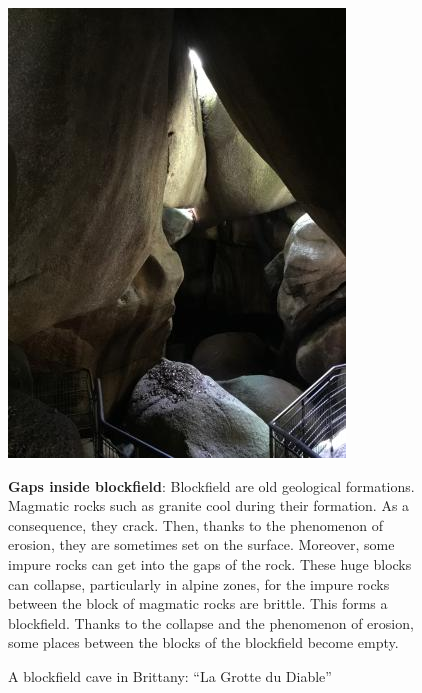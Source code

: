\documentclass[draft, final]{report}
\begin{document}
\begin{itemize}
\begin{figure}[!ht]
  \begin{minipage}[c]{0.50\linewidth}
    \begin{center}
      \includegraphics[scale=0.4]{LateX/Images/la-grotte-du-diable.jpg}
      \caption{A blockfield cave in Brittany: ``La Grotte du Diable''\cite{blockfieldcave}}
    \end{center}
\end{minipage} \hfill
\begin{minipage}[c]{0.50\linewidth}
  \item \textbf{Gaps inside blockfield}: Blockfield are old geological formations. Magmatic rocks such as granite cool during their formation. As a consequence, they crack. Then, thanks to the phenomenon of erosion, they are sometimes set on the surface. Moreover, some impure rocks can get into the gaps of the rock. These huge blocks can collapse, particularly in alpine zones, for the impure rocks between the block of magmatic rocks are brittle. This forms a blockfield. Thanks to the collapse and the phenomenon of erosion, some places between the blocks of the blockfield become empty.
  \end{minipage}
\end{figure}


\end{itemize}
\end{document}

